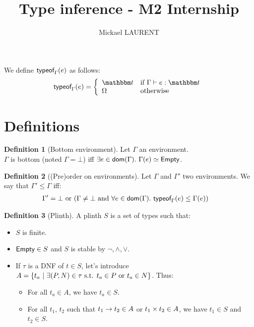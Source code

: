 \documentclass[a4paper]{article}
\title{\vspace{1.5cm}Type inference - M2 Internship}
\author{Mickael LAURENT}
\date{\vspace{-5ex}}
\theoremstyle{definition}
\newtheorem{definition}{Definition}
\begin{document}
  \maketitle

  We define $\textsf{typeof}_{\Gamma}(e)$ as follows:
  \begin{align*}
    \tyof e \Gamma = 
    \left\{\begin{array}{ll}
      \ts & \text{if } \Gamma \vdash e:\ts \\
      \tsempty & \text{otherwise}
    \end{array}\right.
  \end{align*}

  \section{Definitions}

    \begin{definition}[Bottom environment]
      Let $\Gamma$ an environment.\\
      $\Gamma$ is bottom (noted $\Gamma = \bot$) iff $\exists e\in\dom\Gamma.\ \Gamma(e)\simeq\Empty$.
    \end{definition}

    \begin{definition}[(Pre)order on environments]
    Let $\Gamma$ and $\Gamma'$ two environments. We say that $\Gamma' \leq \Gamma$ iff:
    \begin{align*}
        &\Gamma'=\bot \text{ or } (\Gamma\neq\bot \text{ and } \forall e \in \textsf{dom}(\Gamma).\ \textsf{typeof}_{\Gamma}(e) \leq \Gamma(e))
    \end{align*}
    \end{definition}

    \begin{definition}[Plinth]
      A plinth $S$ is a set of types such that:
      \begin{itemize}
        \item $S$ is finite.
        \item $\textsf{Empty} \in S$ and $S$ is stable by $\neg, \land, \vee$. 
        \item If $\tau$ is a DNF of $t\in S$, let's introduce $A=\{t_a ~|~ \exists (P,N) \in \tau \text{ s.t. } t_a \in P \text{ or } t_a \in N \}$. Thus:
        \begin{itemize}
          \item For all $t_a \in A$, we have $t_a \in S$.
          \item For all $t_1$, $t_2$ such that $t_1\to t_2 \in A$ or $t_1\times t_2 \in A$,
          we have $t_1 \in S$ and $t_2 \in S$.
        \end{itemize}
      \end{itemize}
    \end{definition}
\end{document}
